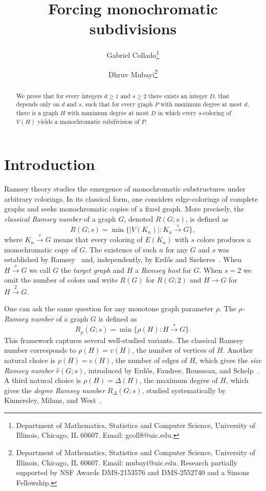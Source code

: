 \documentclass[11pt]{article}
\title{Forcing monochromatic subdivisions}
\author{Gabriel Collado\footnote{Department of Mathematics, Statistics and Computer Science, University of Illinois, Chicago, IL 60607. Email: gcoll8@uic.edu.} \and 
Dhruv Mubayi\footnote{Department of Mathematics, Statistics and Computer Science, University of Illinois, Chicago, IL 60607. Email: mubayi@uic.edu. Research partially supported by NSF Awards DMS-2153576 and DMS-2552740
and a Simons Fellowship.}}
\date{}
\theoremstyle{definition}
\begin{document}
\maketitle

\begin{abstract}
We prove that for every integers $d \ge 1$ and $s\ge2$ there exists an integer $D$, that depends only on $d$ and $s$, such that for every graph $P$ with maximum degree at most $ d$, there is a graph $H$ with maximum degree at most $D$ in which every $s$-coloring of $V(H)$ yields a monochromatic subdivision of $P$. 
\end{abstract}

\section{Introduction}

Ramsey theory studies the emergence of monochromatic substructures under arbitrary colorings. In its classical form, one considers edge-colorings of complete graphs and seeks monochromatic copies of a fixed graph. More precisely, the \textit{classical Ramsey number} of a graph $G$,
denoted $R(G;s)$, is defined as
\[
  R(G;s) = \min\bigl\{ |V(K_n)| : K_n \xrightarrow{s} G \bigr\},
\]
where $K_n \xrightarrow{s} G$ means that every coloring of $E(K_n)$ with $s$ colors produces a monochromatic copy of $G$. The existence of such $n$ for any $G$ and $s$ was established by Ramsey~\cite{Ramsey1930} and, independently, by Erd\H{o}s and Szekeres~\cite{ErdosSzekeres1935}.
When $H \xrightarrow{s} G$ we call $G$ the \textit{target graph} and $H$ a \textit{Ramsey host} for $G$. When $s = 2$ we omit the number of colors and write $R(G)$ for $ R(G;2)$ and $H \xrightarrow{} G $ for $ H \xrightarrow{2} G$.
 
One can ask the same question for any monotone graph parameter $\rho$. The
\textit{$\rho$-Ramsey number} of a graph $G$ is defined as
\[
  R_\rho(G;s) = \min\bigl\{ \rho(H) : H \xrightarrow{s} G \bigr\}.
\]
This framework captures several well-studied variants. The classical Ramsey number corresponds to
$\rho(H) = v(H)$, the number of vertices of $H$. Another natural choice is $\rho(H) = e(H)$,
the number of edges of $H$, which gives the \textit{size Ramsey number} $\hat{r}(G;s)$,
introduced by Erd\H{o}s, Faudree, Rousseau, and Schelp~\cite{ErdosFaudreeRousseauSchelp1978}. A third
natural choice is $\rho(H) = \Delta(H)$, the maximum degree of $H$, which gives the
\textit{degree Ramsey number} $R_\Delta(G;s)$, studied systematically by Kinnersley, Milans, and
West~\cite{KinnersleyMilansWest2012}.
 
\end{document}
